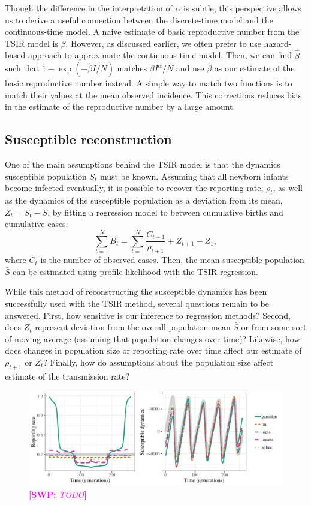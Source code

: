\documentclass{article}
\newcommand{\comment}[3]{\textcolor{#1}{\textbf{[#2: }\textsl{#3}\textbf{]}}}
\newcommand{\swp}[1]{\comment{magenta}{SWP}{#1}}
\begin{document}
Though the difference in the interpretation of $\alpha$ is subtle, this perspective allows us to derive a useful connection between the discrete-time model and the continuous-time model.
A naive estimate of basic reproductive number from the TSIR model is $\beta$.
However, as discussed earlier, we often prefer to use hazard-based approach to approximate the continuous-time model. 
Then, we can find $\hat \beta$ such that $1 - \exp(-\hat\beta I/N)$ matches $\beta I^\alpha/N$ and use $\hat \beta$ as our estimate of the basic reproductive number instead.
A simple way to match two functions is to match their values at the mean observed incidence.
This corrections reduces bias in the estimate of the reproductive number by a large amount.

\subsection{Susceptible reconstruction}

One of the main assumptions behind the TSIR model is that the dynamics susceptible population $S_t$ must be known.
Assuming that all newborn infants become infected eventually, it is possible to recover the reporting rate, $\rho_t$, as well as the dynamics of the susceptible population as a deviation from its mean, $Z_t = S_t - \bar{S}$, by fitting a regression model to between cumulative births and cumulative cases: 
\begin{equation}
\sum_{t=1}^N B_t = \sum_{t=1}^N \frac{C_{t+1}}{\rho_{t+1}} + Z_{t+1} - Z_1,
\end{equation}
where $C_t$ is the number of observed cases. 
Then, the mean susceptible population $\bar S$ can be estimated using profile likelihood with the TSIR regression.

While this method of reconstructing the susceptible dynamics has been successfully used with the TSIR method, 
several questions remain to be answered.
First, how sensitive is our inference to regression methods?
Second, does $Z_t$ represent deviation from the overall population mean $\bar{S}$ or from some sort of moving average (assuming that population changes over time)?
Likewise, how does changes in population size or reporting rate over time affect our estimate of $\rho_{t+1}$ or $Z_t$?
Finally, how do assumptions about the population size affect estimate of the transmission rate?

\begin{figure}
\includegraphics[width=\textwidth]{../figure/susceptible_reconstruction_tsir.pdf}
\caption{
\swp{TODO}
}
\label{fig:tsirrecon}
\end{figure}
\end{document}
